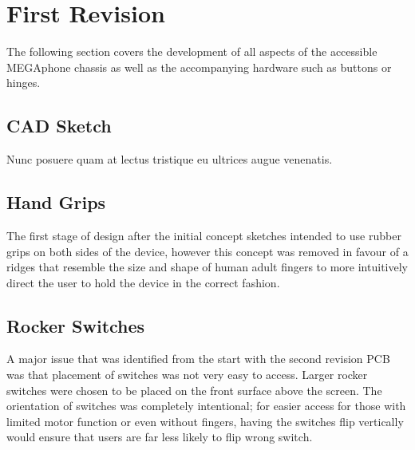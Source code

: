 

\section{First Revision}

The following section covers the development of all aspects of the accessible MEGAphone chassis as well as the accompanying hardware such as buttons or hinges.

\subsection{CAD Sketch}

Nunc posuere quam at lectus tristique eu ultrices augue venenatis.

\subsection{Hand Grips}

The first stage of design after the initial concept sketches intended to use rubber grips on both sides of the device, however this concept was removed in favour of a ridges that resemble the size and shape of human adult fingers to more intuitively direct the user to hold the device in the correct fashion. 


\subsection{Rocker Switches}
A major issue that was identified from the start with the second revision PCB was that placement of switches was not very easy to access.
Larger rocker switches were chosen to be placed on the front surface above the screen. 
The orientation of switches was completely intentional; for easier access for those with limited motor function or even without fingers, having the switches flip vertically would ensure that users are far less likely to flip wrong switch.

